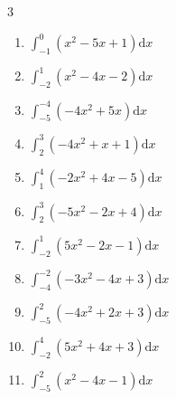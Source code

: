 \begin{multicols}{3}
\begin{enumerate}
  \item $\displaystyle \int_{-1}^{0}\left( x^{2}-5x+1 \right) \mathrm{d}x$

        \phantom{$\displaystyle =3$}

  \item $\displaystyle \int_{-2}^{1}\left( x^{2}-4x-2 \right) \mathrm{d}x$

        \phantom{$\displaystyle =8$}

  \item $\displaystyle \int_{-5}^{-4}\left( -4x^{2}+5x \right) \mathrm{d}x$


  \item $\displaystyle \int_{2}^{3}\left( -4x^{2}+x+1 \right) \mathrm{d}x$


  \item $\displaystyle \int_{1}^{4}\left( -2x^{2}+4x-5 \right) \mathrm{d}x$


\columnbreak %

  \item $\displaystyle \int_{2}^{3}\left( -5x^{2}-2x+4 \right) \mathrm{d}x$

        \phantom{$\displaystyle =-36$}

  \item $\displaystyle \int_{-2}^{1}\left( 5x^{2}-2x-1 \right) \mathrm{d}x$


  \item $\displaystyle \int_{-4}^{-2}\left( -3x^{2}-4x+3 \right) \mathrm{d}x$

        \phantom{$\displaystyle =-31$}

  \item $\displaystyle \int_{-5}^{2}\left( -4x^{2}+2x+3 \right) \mathrm{d}x$


  \item $\displaystyle \int_{-2}^{4}\left( 5x^{2}+4x+3 \right) \mathrm{d}x$

        \phantom{$\displaystyle =147$}

\columnbreak %

\resetques

  \item $\displaystyle \int_{-5}^{2}\left( x^{2}-4x-1 \right) \mathrm{d}x$


\end{enumerate}
\end{multicols}

